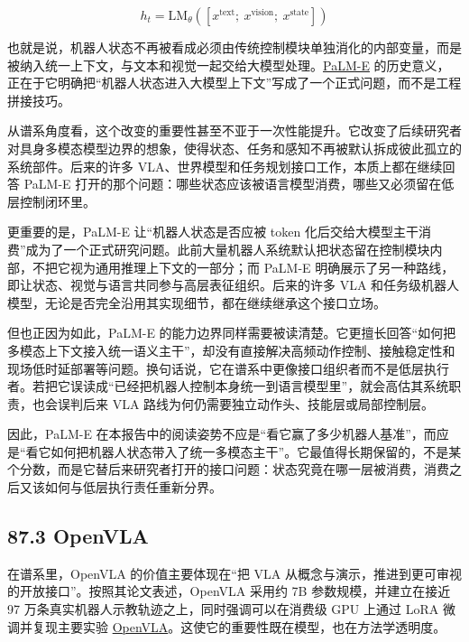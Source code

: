 \begingroup
\scriptsize
\begin{equation*}
h_t = \mathrm{LM}_{\theta}\!\left([x^{\text{text}};\ x^{\text{vision}};\ x^{\text{state}}]\right)
\end{equation*}
\endgroup

也就是说，机器人状态不再被看成必须由传统控制模块单独消化的内部变量，而是被纳入统一上下文，与文本和视觉一起交给大模型处理。\href{https://arxiv.org/abs/2303.03378}{PaLM-E} 的历史意义，正在于它明确把“机器人状态进入大模型上下文”写成了一个正式问题，而不是工程拼接技巧。

从谱系角度看，这个改变的重要性甚至不亚于一次性能提升。它改变了后续研究者对具身多模态模型边界的想象，使得状态、任务和感知不再被默认拆成彼此孤立的系统部件。后来的许多 VLA、世界模型和任务规划接口工作，本质上都在继续回答 PaLM-E 打开的那个问题：哪些状态应该被语言模型消费，哪些又必须留在低层控制闭环里。

更重要的是，PaLM-E 让“机器人状态是否应被 token 化后交给大模型主干消费”成为了一个正式研究问题。此前大量机器人系统默认把状态留在控制模块内部，不把它视为通用推理上下文的一部分；而 PaLM-E 明确展示了另一种路线，即让状态、视觉与语言共同参与高层表征组织。后来的许多 VLA 和任务级机器人模型，无论是否完全沿用其实现细节，都在继续继承这个接口立场。

但也正因为如此，PaLM-E 的能力边界同样需要被读清楚。它更擅长回答“如何把多模态上下文接入统一语义主干”，却没有直接解决高频动作控制、接触稳定性和现场低时延部署等问题。换句话说，它在谱系中更像接口组织者而不是低层执行者。若把它误读成“已经把机器人控制本身统一到语言模型里”，就会高估其系统职责，也会误判后来 VLA 路线为何仍需要独立动作头、技能层或局部控制层。

因此，PaLM-E 在本报告中的阅读姿势不应是“看它赢了多少机器人基准”，而应是“看它如何把机器人状态带入了统一多模态主干”。它最值得长期保留的，不是某个分数，而是它替后来研究者打开的接口问题：状态究竟在哪一层被消费，消费之后又该如何与低层执行责任重新分界。

\subsection*{87.3 OpenVLA}


在谱系里，OpenVLA 的价值主要体现在“把 VLA 从概念与演示，推进到更可审视的开放接口”。按照其论文表述，OpenVLA 采用约 7B 参数规模，并建立在接近 97 万条真实机器人示教轨迹之上，同时强调可以在消费级 GPU 上通过 LoRA 微调并复现主要实验 \href{https://arxiv.org/abs/2406.09246}{OpenVLA}。这使它的重要性既在模型，也在方法学透明度。

